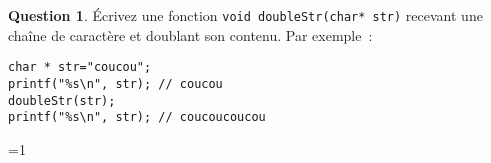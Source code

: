 \documentclass[11pt,a4paper,dvipsnames]{article}
\theoremstyle{definition}%
\newtheorem{Q}{Question}[] %
\newcounter{reponseCnt}
\begin{document}
\begin{Q}
Écrivez une fonction \texttt{void doubleStr(char* str)} recevant une chaîne de caractère et doublant son contenu.
Par exemple~:
\begin{verbatim}
char * str="coucou";
printf("%s\n", str); // coucou
doubleStr(str);
printf("%s\n", str); // coucoucoucou
\end{verbatim}

\ifnum\value{reponseCnt}=1
  
\fi
\end{Q}
\end{document}
